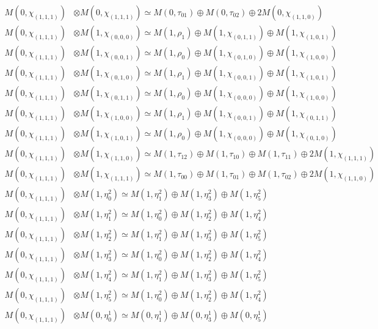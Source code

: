 \begin{align*}
M(0,\chi_{(1,1,1)}) &\otimes M(0,\chi_{(1,1,1)}) \simeq M(0,\tau_{01}) \oplus M(0,\tau_{02}) \oplus 2 M(0,\chi_{(1,1,0)}) \\
M(0,\chi_{(1,1,1)}) &\otimes M(1,\chi_{(0,0,0)}) \simeq M(1,\rho_{1}) \oplus M(1,\chi_{(0,1,1)}) \oplus M(1,\chi_{(1,0,1)}) \\
M(0,\chi_{(1,1,1)}) &\otimes M(1,\chi_{(0,0,1)}) \simeq M(1,\rho_{0}) \oplus M(1,\chi_{(0,1,0)}) \oplus M(1,\chi_{(1,0,0)}) \\
M(0,\chi_{(1,1,1)}) &\otimes M(1,\chi_{(0,1,0)}) \simeq M(1,\rho_{1}) \oplus M(1,\chi_{(0,0,1)}) \oplus M(1,\chi_{(1,0,1)}) \\
M(0,\chi_{(1,1,1)}) &\otimes M(1,\chi_{(0,1,1)}) \simeq M(1,\rho_{0}) \oplus M(1,\chi_{(0,0,0)}) \oplus M(1,\chi_{(1,0,0)}) \\
M(0,\chi_{(1,1,1)}) &\otimes M(1,\chi_{(1,0,0)}) \simeq M(1,\rho_{1}) \oplus M(1,\chi_{(0,0,1)}) \oplus M(1,\chi_{(0,1,1)}) \\
M(0,\chi_{(1,1,1)}) &\otimes M(1,\chi_{(1,0,1)}) \simeq M(1,\rho_{0}) \oplus M(1,\chi_{(0,0,0)}) \oplus M(1,\chi_{(0,1,0)}) \\
M(0,\chi_{(1,1,1)}) &\otimes M(1,\chi_{(1,1,0)}) \simeq M(1,\tau_{12}) \oplus M(1,\tau_{10}) \oplus M(1,\tau_{11}) \oplus 2 M(1,\chi_{(1,1,1)}) \\
M(0,\chi_{(1,1,1)}) &\otimes M(1,\chi_{(1,1,1)}) \simeq M(1,\tau_{00}) \oplus M(1,\tau_{01}) \oplus M(1,\tau_{02}) \oplus 2 M(1,\chi_{(1,1,0)}) \\
M(0,\chi_{(1,1,1)}) &\otimes M(1,\eta^{2}_{0}) \simeq M(1,\eta^{2}_{1}) \oplus M(1,\eta^{2}_{3}) \oplus M(1,\eta^{2}_{5}) \\
M(0,\chi_{(1,1,1)}) &\otimes M(1,\eta^{2}_{1}) \simeq M(1,\eta^{2}_{0}) \oplus M(1,\eta^{2}_{2}) \oplus M(1,\eta^{2}_{4}) \\
M(0,\chi_{(1,1,1)}) &\otimes M(1,\eta^{2}_{2}) \simeq M(1,\eta^{2}_{1}) \oplus M(1,\eta^{2}_{3}) \oplus M(1,\eta^{2}_{5}) \\
M(0,\chi_{(1,1,1)}) &\otimes M(1,\eta^{2}_{3}) \simeq M(1,\eta^{2}_{0}) \oplus M(1,\eta^{2}_{2}) \oplus M(1,\eta^{2}_{4}) \\
M(0,\chi_{(1,1,1)}) &\otimes M(1,\eta^{2}_{4}) \simeq M(1,\eta^{2}_{1}) \oplus M(1,\eta^{2}_{3}) \oplus M(1,\eta^{2}_{5}) \\
M(0,\chi_{(1,1,1)}) &\otimes M(1,\eta^{2}_{5}) \simeq M(1,\eta^{2}_{0}) \oplus M(1,\eta^{2}_{2}) \oplus M(1,\eta^{2}_{4}) \\
M(0,\chi_{(1,1,1)}) &\otimes M(0,\eta^{1}_{0}) \simeq M(0,\eta^{1}_{1}) \oplus M(0,\eta^{1}_{3}) \oplus M(0,\eta^{1}_{5}) \\

\end{align*}
